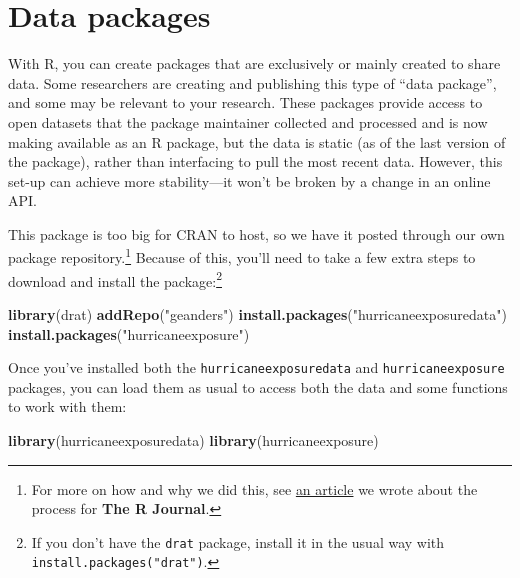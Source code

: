 \documentclass[]{tufte-book}
\newenvironment{Shaded}{}{}
\newcommand{\KeywordTok}[1]{\textcolor[rgb]{0.00,0.44,0.13}{\textbf{#1}}}
\newcommand{\NormalTok}[1]{#1}
\newcommand{\StringTok}[1]{\textcolor[rgb]{0.25,0.44,0.63}{#1}}
\begin{document}
\hypertarget{data-packages}{%
\section{Data packages}\label{data-packages}}

With R, you can create packages that are exclusively or mainly created to share data.
Some researchers are creating and publishing this type of ``data package'', and some
may be relevant to your research. These packages provide access to open datasets that the
package maintainer collected and processed and is now making available as an R package,
but the data is static (as of the last version of the package), rather than interfacing
to pull the most recent data. However, this set-up can achieve more stability---it won't
be broken by a change in an online API.

This package is too big for CRAN to host, so we have it posted through our own package
repository.\footnote{For more on how and why we did this, see
  \href{https://journal.r-project.org/archive/2017/RJ-2017-026/}{an article} we wrote about the
  process for \textbf{The R Journal}.} Because of this, you'll need to take a few extra steps
to download and install the package:\footnote{If you don't have the \texttt{drat} package, install it in
  the usual way with \texttt{install.packages("drat")}.}

\begin{Shaded}
\begin{Highlighting}[]
\KeywordTok{library}\NormalTok{(drat)}
\KeywordTok{addRepo}\NormalTok{(}\StringTok{"geanders"}\NormalTok{)}
\KeywordTok{install.packages}\NormalTok{(}\StringTok{"hurricaneexposuredata"}\NormalTok{)}
\KeywordTok{install.packages}\NormalTok{(}\StringTok{"hurricaneexposure"}\NormalTok{)}
\end{Highlighting}
\end{Shaded}

Once you've installed both the \texttt{hurricaneexposuredata} and \texttt{hurricaneexposure} packages, you
can load them as usual to access both the data and some functions to work with them:

\begin{Shaded}
\begin{Highlighting}[]
\KeywordTok{library}\NormalTok{(hurricaneexposuredata)}
\KeywordTok{library}\NormalTok{(hurricaneexposure)}
\end{Highlighting}
\end{Shaded}
\end{document}
